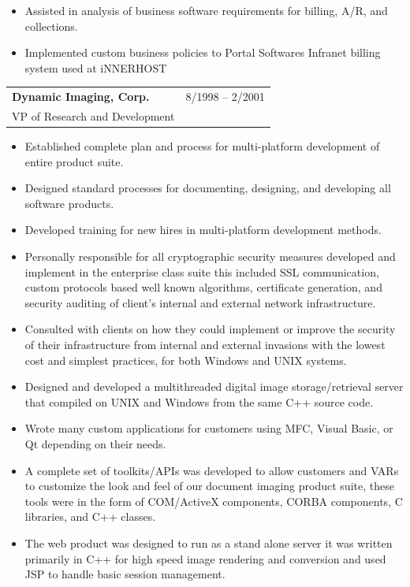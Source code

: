 \documentclass[10pt]{report}
\begin{document}
\begin{itemize}
\item Assisted in analysis of business software requirements for billing, A/R, and collections.
\item Implemented custom business policies to Portal Software\textquotesingle s Infranet billing system used at iNNERHOST
\end{itemize}
\bigskip


\noindent
\begin{tabular}{ L{.5\textwidth}  R{.4\textwidth} }
\textbf{\large Dynamic Imaging, Corp.}  & 8/1998 -- 2/2001 \\
VP of Research and Development &
\end{tabular}

\begin{itemize}
\item Established complete plan and process for multi-platform development of entire product suite.
\item Designed standard processes for documenting, designing, and developing all software products.
\item Developed training for new hires in multi-platform development methods.
\item Personally responsible for all cryptographic security measures developed and implement in the enterprise class suite this included SSL communication, custom protocols based well known algorithms, certificate generation, and security auditing of client’s internal and external network infrastructure.
\item Consulted with clients on how they could implement or improve the security of their infrastructure from internal and external invasions with the lowest cost and simplest practices, for both Windows and UNIX systems.
\item Designed and developed a multithreaded digital image storage/retrieval server that compiled on UNIX and Windows from the same C++ source code.
\item Wrote many custom applications for customers using MFC, Visual Basic, or Qt depending on their needs.
\item A complete set of toolkits/APIs was developed to allow customers and VARs to customize the look and feel of our document imaging product suite, these tools were in the form of COM/ActiveX components, CORBA components, C libraries, and C++ classes.
\item The web product was designed to run as a stand alone server it was written primarily in C++ for high speed image rendering and conversion and used JSP to handle basic session management.
\end{itemize}
\bigskip
\end{document}
